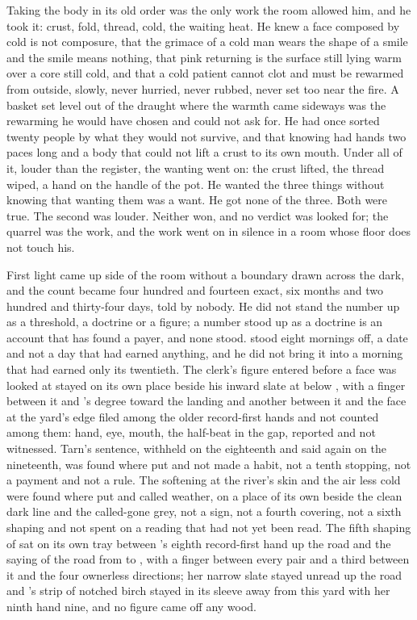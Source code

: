 Taking the body in its old order was the only work the room allowed him, and he took it: crust, fold, thread, cold, the waiting heat. He knew a face composed by cold is not composure, that the grimace of a cold man wears the shape of a smile and the smile means nothing, that pink returning is the surface still lying warm over a core still cold, and that a cold patient cannot clot and must be rewarmed from outside, slowly, never hurried, never rubbed, never set too near the fire. A basket set level out of the draught where the warmth came sideways was the rewarming he would have chosen and could not ask for. He had once sorted twenty people by what they would not survive, and that knowing had hands two paces long and a body that could not lift a crust to its own mouth. Under all of it, louder than the register, the wanting went on: the crust lifted, the thread wiped, a hand on the handle of the pot. He wanted the three things without knowing that wanting them was a want. He got none of the three. Both were true. The second was louder. Neither won, and no verdict was looked for; the quarrel was the work, and the work went on in silence in a room whose floor does not touch his.

First light came up  side of the room without a boundary drawn across the dark, and the count became four hundred and fourteen exact, six months and two hundred and thirty-four days, told by nobody. He did not stand the number up as a threshold, a doctrine or a figure; a number stood up as a doctrine is an account that has found a payer, and none stood.  stood eight mornings off, a date and not a day that had earned anything, and he did not bring it into a morning that had earned only its twentieth. The clerk's figure entered before a face was looked at stayed on its own place beside his inward slate at  below , with a finger between it and 's degree toward the landing and another between it and the face at the yard's edge filed among the older record-first hands and not counted among them: hand, eye, mouth, the half-beat in the gap, reported and not witnessed. Tarn's sentence, withheld on the eighteenth and said again on the nineteenth, was found where put and not made a habit, not a tenth stopping, not a payment and not a rule. The softening at the river's skin and the air less cold were found where put and called weather, on a place of its own beside the clean dark line and the called-gone grey, not a sign, not a fourth covering, not a sixth shaping and not spent on a reading that had not yet been read. The fifth shaping of  sat on its own tray between 's eighth record-first hand up the road and the saying of the road from  to , with a finger between every pair and a third between it and the four ownerless directions; her narrow slate stayed unread up the road and 's strip of notched birch stayed in its sleeve away from this yard with her ninth hand nine, and no figure came off any wood.

